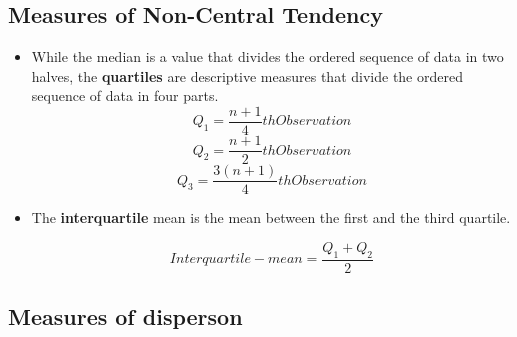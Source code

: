 \documentclass[11pt]{article}
\begin{document}
    \subsection{Measures of Non-Central Tendency}

    \begin{itemize}
        \item While the median is a value that divides the ordered sequence of data in two halves, the \textbf{quartiles} are descriptive measures that divide the ordered sequence of data in four parts.
        $$ Q_1 = \frac{n+1}{4}th Observation $$
        $$ Q_2 = \frac{n+1}{2}th Observation $$
        $$ Q_3 = \frac{3(n+1)}{4}th Observation $$

        \item The \textbf{interquartile} mean is the mean between the first and the third quartile.

        $$Interquartile-mean = \frac{Q_1 + Q_2}{2}$$
    \end{itemize}

    \subsection{Measures of disperson}
    
\end{document}
